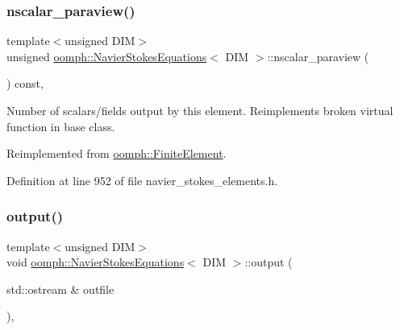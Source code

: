 \mbox{\label{classoomph_1_1NavierStokesEquations_a00a118bdb452a5caceeb605ad9db22cd}} 
\subsubsection{\texorpdfstring{nscalar\+\_\+paraview()}{nscalar\_paraview()}}
{\footnotesize\ttfamily template$<$unsigned D\+IM$>$ \\
unsigned \hyperlink{classoomph_1_1NavierStokesEquations}{oomph\+::\+Navier\+Stokes\+Equations}$<$ D\+IM $>$\+::nscalar\+\_\+paraview (\begin{DoxyParamCaption}{ }\end{DoxyParamCaption}) const\hspace{0.3cm}{\ttfamily [inline]}, {\ttfamily [virtual]}}



Number of scalars/fields output by this element. Reimplements broken virtual function in base class. 



Reimplemented from \hyperlink{classoomph_1_1FiniteElement_a865e2e5586552ba80babdbe26a77fe8c}{oomph\+::\+Finite\+Element}.



Definition at line 952 of file navier\+\_\+stokes\+\_\+elements.\+h.

\mbox{\label{classoomph_1_1NavierStokesEquations_ae2c8742419aae8961eb34dad989c69b9}} 
\subsubsection{\texorpdfstring{output()}{output()}\hspace{0.1cm}{\footnotesize\ttfamily [1/4]}}
{\footnotesize\ttfamily template$<$unsigned D\+IM$>$ \\
void \hyperlink{classoomph_1_1NavierStokesEquations}{oomph\+::\+Navier\+Stokes\+Equations}$<$ D\+IM $>$\+::output (\begin{DoxyParamCaption}\item[{std\+::ostream \&}]{outfile }\end{DoxyParamCaption})\hspace{0.3cm}{\ttfamily [inline]}, {\ttfamily [virtual]}}




